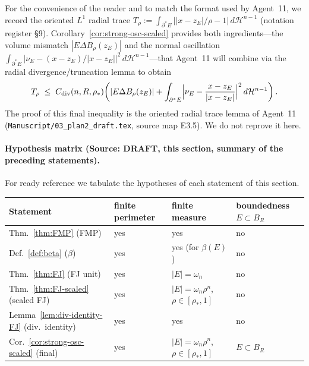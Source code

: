 \begin{remark}
\label{rem:radial-trace-context}
For the convenience of the reader and to match the format used by
Agent~11, we record the oriented $L^1$ radial trace
$T_\rho:=\int_{\partial^*E}\bigl||x-z_E|/\rho-1\bigr|\,d\mathcal H^{n-1}$
(notation register \S9). Corollary~\ref{cor:strong-osc-scaled} provides
both ingredients—the volume mismatch $|E\Delta B_\rho(z_E)|$ and the
normal oscillation $\int_{\partial^*E}|\nu_E-(x-z_E)/|x-z_E||^2\,
d\mathcal H^{n-1}$—that Agent~11 will combine via the radial
divergence/truncation lemma to obtain
\[
   T_\rho\;\le\;C_{\mathrm{div}}(n,R,\rho_*)\!
   \left(|E\Delta B_\rho(z_E)|
   +\int_{\partial^*E}
   \Bigl|\nu_E-\frac{x-z_E}{|x-z_E|}\Bigr|^2\,d\mathcal H^{n-1}\right).
\]
The proof of this final inequality is the oriented radial trace lemma
of Agent~11 (\texttt{Manuscript/03\_plan2\_draft.tex}, source map E3.5).
We do not reprove it here.
\end{remark}

\paragraph{Hypothesis matrix (Source: DRAFT, this section, summary of
the preceding statements).}
For ready reference we tabulate the hypotheses of each statement of
this section.
\begin{center}
\begin{tabular}{l|l|l|l}
Statement & finite perimeter & finite measure & boundedness $E\subset B_R$\\\hline
Thm.~\ref{thm:FMP} (FMP) & yes & yes & no \\
Def.~\ref{def:beta} ($\beta$) & yes & yes (for $\beta(E)$) & no \\
Thm.~\ref{thm:FJ} (FJ unit) & yes & $|E|=\omega_n$ & no \\
Thm.~\ref{thm:FJ-scaled} (scaled FJ) & yes &
   $|E|=\omega_n\rho^n$, $\rho\in[\rho_*,1]$ & no \\
Lemma~\ref{lem:div-identity-FJ} (div.\ identity) & yes & yes & no \\
Cor.~\ref{cor:strong-osc-scaled} (final) & yes &
   $|E|=\omega_n\rho^n$, $\rho\in[\rho_*,1]$ & $E\subset B_R$ \\
\end{tabular}
\end{center}

